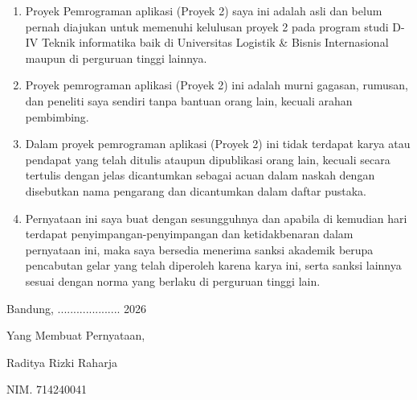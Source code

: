 \begin{enumerate}[leftmargin=1cm]
    \item Proyek Pemrograman aplikasi (Proyek 2) saya ini adalah asli dan belum pernah diajukan untuk memenuhi kelulusan proyek 2 pada program studi D-IV Teknik informatika baik di Universitas Logistik \& Bisnis Internasional maupun di perguruan tinggi lainnya.
    \item Proyek pemrograman aplikasi (Proyek 2) ini adalah murni gagasan, rumusan, dan peneliti saya sendiri tanpa bantuan orang lain, kecuali arahan pembimbing.
    \item Dalam proyek pemrograman aplikasi (Proyek 2) ini tidak terdapat karya atau pendapat yang telah ditulis ataupun dipublikasi orang lain, kecuali secara tertulis dengan jelas dicantumkan sebagai acuan dalam naskah dengan disebutkan nama pengarang dan dicantumkan dalam daftar pustaka.
    \item Pernyataan ini saya buat dengan sesungguhnya dan apabila di kemudian hari terdapat penyimpangan-penyimpangan dan ketidakbenaran dalam pernyataan ini, maka saya bersedia menerima sanksi akademik berupa pencabutan gelar yang telah diperoleh karena karya ini, serta sanksi lainnya sesuai dengan norma yang berlaku di perguruan tinggi lain.
\end{enumerate}

\vspace{1cm}

\hfill Bandung, .................... 2026

\vspace{0.5cm}

\hfill Yang Membuat Pernyataan,

\vspace{1cm}

\hfill \underline{\hspace{5cm}}

\hfill Raditya Rizki Raharja

\hfill NIM. 714240041
